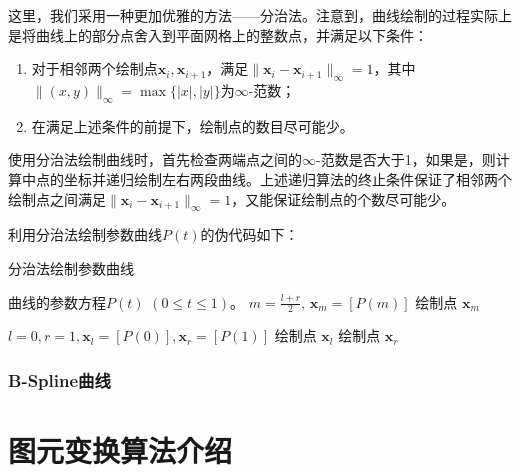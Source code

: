 \documentclass[a4paper,12pt]{article}
\begin{document}
这里，我们采用一种更加优雅的方法——分治法。注意到，曲线绘制的过程实际上是将曲线上的部分点舍入到平面网格上的整数点，并满足以下条件：

\begin{enumerate}
	\item 对于相邻两个绘制点$\bm{x}_i, \bm{x}_{i+1}$，满足$\|\bm{x}_i - \bm{x}_{i+1}\|_{\infty} = 1$，其中$\| (x, y) \|_{\infty} = \max\{|x|, |y|\}$为$\infty$-范数；
	\item 在满足上述条件的前提下，绘制点的数目尽可能少。
\end{enumerate}

使用分治法绘制曲线时，首先检查两端点之间的$\infty$-范数是否大于1，如果是，则计算中点的坐标并递归绘制左右两段曲线。上述递归算法的终止条件保证了相邻两个绘制点之间满足$\|\bm{x}_i - \bm{x}_{i+1}\|_{\infty} = 1$，又能保证绘制点的个数尽可能少。

利用分治法绘制参数曲线$P(t)$的伪代码如下：

\begin{algorithm}[htb] 
	\caption{分治法绘制参数曲线} 
	\label{alg:DDA} 
	\begin{algorithmic}[1] 
		\Require 曲线的参数方程$P(t)$ $(0 \leq t \leq 1)$。
		\State \Return
		\Else
		\State $m = \frac{l+r}{2}$, $\bm{x}_m = [P(m)]$
		\State {}
		\State 绘制点 $\bm{x}_m$
		\State {}
		\EndIf
		\EndFunction
		
		\State $l = 0, r = 1, \bm{x}_l = [P(0)], \bm{x}_r = [P(1)]$
		\State 绘制点 $\bm{x}_l$
		\State {}
		\State 绘制点 $\bm{x}_r$
	\end{algorithmic} 
\end{algorithm}

\subsubsection{B-Spline曲线}

\section{图元变换算法介绍}
\end{document}
